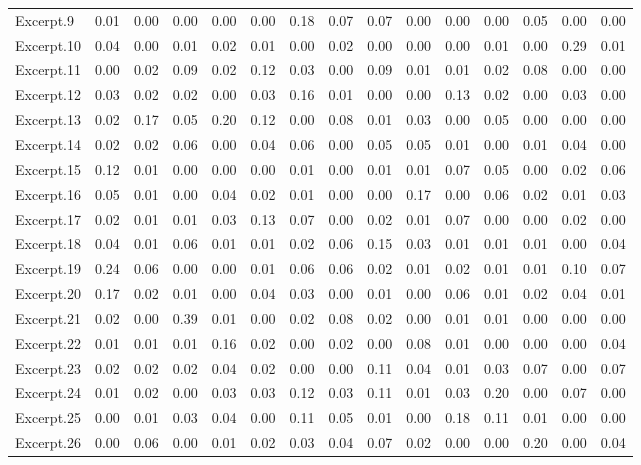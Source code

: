 \documentclass[
]{article}
\newenvironment{lltable}{\begin{landscape}\begin{center}\begin{ThreePartTable}}{\end{ThreePartTable}\end{center}\end{landscape}}
\begin{document}
\begin{lltable}
{\begin{longtable}{lllllllllllllll}
Excerpt.9 & 0.01 & 0.00 & 0.00 & 0.00 & 0.00 & 0.18 & 0.07 & 0.07 & 0.00 & 0.00 & 0.00 & 0.05 & 0.00 & 0.00\\
Excerpt.10 & 0.04 & 0.00 & 0.01 & 0.02 & 0.01 & 0.00 & 0.02 & 0.00 & 0.00 & 0.00 & 0.01 & 0.00 & 0.29 & 0.01\\
Excerpt.11 & 0.00 & 0.02 & 0.09 & 0.02 & 0.12 & 0.03 & 0.00 & 0.09 & 0.01 & 0.01 & 0.02 & 0.08 & 0.00 & 0.00\\
Excerpt.12 & 0.03 & 0.02 & 0.02 & 0.00 & 0.03 & 0.16 & 0.01 & 0.00 & 0.00 & 0.13 & 0.02 & 0.00 & 0.03 & 0.00\\
Excerpt.13 & 0.02 & 0.17 & 0.05 & 0.20 & 0.12 & 0.00 & 0.08 & 0.01 & 0.03 & 0.00 & 0.05 & 0.00 & 0.00 & 0.00\\
Excerpt.14 & 0.02 & 0.02 & 0.06 & 0.00 & 0.04 & 0.06 & 0.00 & 0.05 & 0.05 & 0.01 & 0.00 & 0.01 & 0.04 & 0.00\\
Excerpt.15 & 0.12 & 0.01 & 0.00 & 0.00 & 0.00 & 0.01 & 0.00 & 0.01 & 0.01 & 0.07 & 0.05 & 0.00 & 0.02 & 0.06\\
Excerpt.16 & 0.05 & 0.01 & 0.00 & 0.04 & 0.02 & 0.01 & 0.00 & 0.00 & 0.17 & 0.00 & 0.06 & 0.02 & 0.01 & 0.03\\
Excerpt.17 & 0.02 & 0.01 & 0.01 & 0.03 & 0.13 & 0.07 & 0.00 & 0.02 & 0.01 & 0.07 & 0.00 & 0.00 & 0.02 & 0.00\\
Excerpt.18 & 0.04 & 0.01 & 0.06 & 0.01 & 0.01 & 0.02 & 0.06 & 0.15 & 0.03 & 0.01 & 0.01 & 0.01 & 0.00 & 0.04\\
Excerpt.19 & 0.24 & 0.06 & 0.00 & 0.00 & 0.01 & 0.06 & 0.06 & 0.02 & 0.01 & 0.02 & 0.01 & 0.01 & 0.10 & 0.07\\
Excerpt.20 & 0.17 & 0.02 & 0.01 & 0.00 & 0.04 & 0.03 & 0.00 & 0.01 & 0.00 & 0.06 & 0.01 & 0.02 & 0.04 & 0.01\\
Excerpt.21 & 0.02 & 0.00 & 0.39 & 0.01 & 0.00 & 0.02 & 0.08 & 0.02 & 0.00 & 0.01 & 0.01 & 0.00 & 0.00 & 0.00\\
Excerpt.22 & 0.01 & 0.01 & 0.01 & 0.16 & 0.02 & 0.00 & 0.02 & 0.00 & 0.08 & 0.01 & 0.00 & 0.00 & 0.00 & 0.04\\
Excerpt.23 & 0.02 & 0.02 & 0.02 & 0.04 & 0.02 & 0.00 & 0.00 & 0.11 & 0.04 & 0.01 & 0.03 & 0.07 & 0.00 & 0.07\\
Excerpt.24 & 0.01 & 0.02 & 0.00 & 0.03 & 0.03 & 0.12 & 0.03 & 0.11 & 0.01 & 0.03 & 0.20 & 0.00 & 0.07 & 0.00\\
Excerpt.25 & 0.00 & 0.01 & 0.03 & 0.04 & 0.00 & 0.11 & 0.05 & 0.01 & 0.00 & 0.18 & 0.11 & 0.01 & 0.00 & 0.00\\
Excerpt.26 & 0.00 & 0.06 & 0.00 & 0.01 & 0.02 & 0.03 & 0.04 & 0.07 & 0.02 & 0.00 & 0.00 & 0.20 & 0.00 & 0.04\\

\end{longtable}}
\end{lltable}
\end{document}
